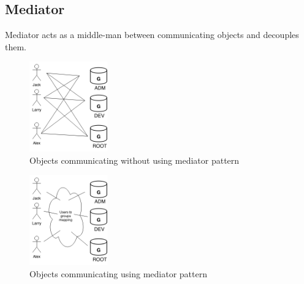 \documentclass[10pt,letterpaper]{article}
\begin{document}
\begin{multicols}{2}
\subsection{Mediator}\label{ssection:mediator}

Mediator acts as a middle-man between communicating objects and decouples them\cite{sm-mediator}.

\begin{figure}[H]
	\centering
	\includegraphics[width=0.3\textwidth]{assets/mediator_before}
	\caption{Objects communicating without using mediator pattern}
	\label{fig:mediator-before}
\end{figure}

\begin{figure}[H]
	\centering
	\includegraphics[width=0.3\textwidth]{assets/mediator_after}
	\caption{Objects communicating using mediator pattern}
	\label{fig:mediator-after}
\end{figure}


\end{multicols}
\end{document}
